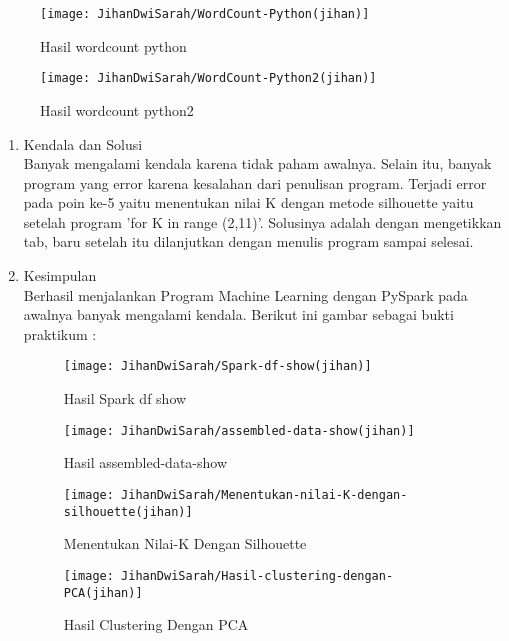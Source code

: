 \begin{enumerate}
\begin{figure}[!ht]
\texttt{[image: JihanDwiSarah/WordCount-Python(jihan)]}
\caption{Hasil wordcount python}
\label{gam:WordCount-Python(jihan)}
\end{figure} 


\begin{figure}[!ht]
\texttt{[image: JihanDwiSarah/WordCount-Python2(jihan)]}
\caption{Hasil wordcount python2}
\label{gam:WordCount-Python2(jihan)}
\end{figure} 

\end{enumerate}


\begin{enumerate}
\item Kendala dan Solusi\\
Banyak mengalami kendala karena tidak paham awalnya. Selain itu, banyak program yang error karena kesalahan dari penulisan program. Terjadi error pada poin ke-5 yaitu menentukan nilai K dengan metode silhouette yaitu setelah program 'for K in range (2,11)'. Solusinya adalah dengan mengetikkan tab, baru setelah itu dilanjutkan dengan menulis program sampai selesai.

\item Kesimpulan \\
Berhasil menjalankan Program Machine Learning dengan PySpark pada awalnya banyak mengalami kendala. Berikut ini gambar sebagai bukti praktikum : 

\begin{figure}[!ht]
\texttt{[image: JihanDwiSarah/Spark-df-show(jihan)]}
\caption{Hasil Spark df show}
\label{gam:Spark-df-show(jihan)}
\end{figure}

\begin{figure}[!ht]
\texttt{[image: JihanDwiSarah/assembled-data-show(jihan)]}
\caption{Hasil assembled-data-show}
\label{gam:assembled-data-show(jihan)}
\end{figure}

\begin{figure}[!ht]
\texttt{[image: JihanDwiSarah/Menentukan-nilai-K-dengan-silhouette(jihan)]}
\caption{Menentukan Nilai-K Dengan Silhouette}
\label{gam:Menentukan-nilai-K-dengan-silhouette(jihan)}
\end{figure}

\begin{figure}[!ht]
\texttt{[image: JihanDwiSarah/Hasil-clustering-dengan-PCA(jihan)]}
\caption{Hasil Clustering Dengan PCA}
\label{gam:Hasil-clustering-dengan-PCA(jihan)}
\end{figure}


\end{enumerate}
